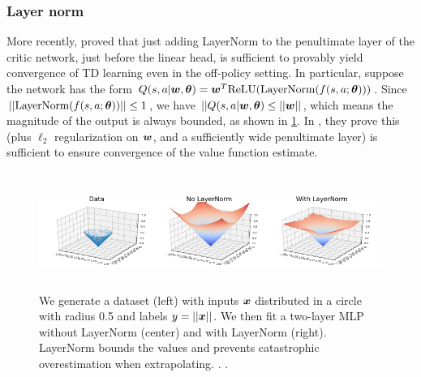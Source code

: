 \subsubsection{Layer norm}

More recently, \citep{PQN} proved that just adding LayerNorm
\citep{Ba2016}
to the penultimate layer of the critic network,
just before the linear head,
is sufficient  to provably yield convergence of TD learning
even in the off-policy setting.
In particular, suppose the network has the form
$Q(s,a|{\bm{w}},{\bm{\theta}}) = {\bm{w}}^T \mathrm{ReLU}(\text{LayerNorm}(f(s,a;{\bm{\theta}})))$.
Since $||\text{LayerNorm}(f(s,a;{\bm{\theta}}))|| \leq 1$, we have
$||Q(s,a|{\bm{w}},{\bm{\theta}}) \leq ||{\bm{w}}||$,
which means the magnitude of the output is always bounded,
as shown in \cref{fig:layerNorm}.
In \citep{PQN}, they prove this (plus $\ell_2$ regularization on ${\bm{w}}$,
and a sufficiently wide penultimate layer)
is sufficient to ensure convergence 
of the value function estimate.



\begin{figure}
\centering
\includegraphics[height=1.5in]{figs/LayerNormFigure}
\caption{
  We generate a dataset (left) with inputs ${\bm{x}}$
  distributed in a circle with radius 0.5 and labels $y = ||{\bm{x}}||$.
  We then fit a two-layer MLP without LayerNorm (center)
  and with LayerNorm (right).
  LayerNorm bounds the values and prevents catastrophic overestimation
  when extrapolating.
  .
  .
}
\label{fig:layerNorm}
\end{figure}



